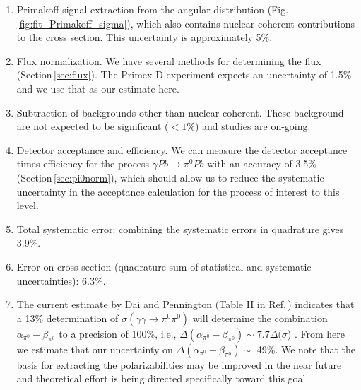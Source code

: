 \begin{enumerate}

\item
Primakoff signal extraction from the angular distribution (Fig.\,\ref{fig:fit_Primakoff_sigma}), which also contains nuclear coherent contributions to the cross section. This uncertainty
is approximately 5\%.

\item
Flux normalization. We have several methods for determining the flux (Section\,\ref{sec:flux}). The Primex-D experiment expects an uncertainty of 1.5\% and we use that as our estimate here.

\item
Subtraction of backgrounds other than nuclear coherent. These background are not expected to be significant ($< 1\%$) and studies are on-going. 

\item
Detector acceptance and efficiency. We can measure the detector acceptance times efficiency for the process $\gamma Pb \rightarrow \pi^0 Pb$ with an accuracy of 3.5\% (Section\,\ref{sec:pi0norm}), which
should allow us to reduce the systematic uncertainty in the acceptance calculation for the process of interest to this level.

\item
Total systematic error: combining the systematic errors in quadrature gives 3.9\%.

\item 
Error on cross section (quadrature sum of statistical and systematic uncertainties): 6.3\%.

\item
The current estimate by Dai and Pennington (Table II in Ref.\,\cite{Dai:2016ytz}) indicates
that a 13\% determination of
$\sigma(\gamma\gamma\rightarrow\pi^0\pi^0)$ will determine the
combination $\alpha_{\pi^0}-\beta_{\pi^0}$ to a precision of 100\%, i.e., $\Delta(\alpha_{\pi^0}-\beta_{\pi^0}) \sim 7.7\Delta(\sigma$) .
From here we estimate that our uncertainty on $\Delta(\alpha_{\pi^0}-\beta_{\pi^0}) \sim$ 49\%. We note that the basis for extracting the polarizabilities may be improved
in the near future and theoretical effort is being directed specifically toward this goal.

\end{enumerate}

